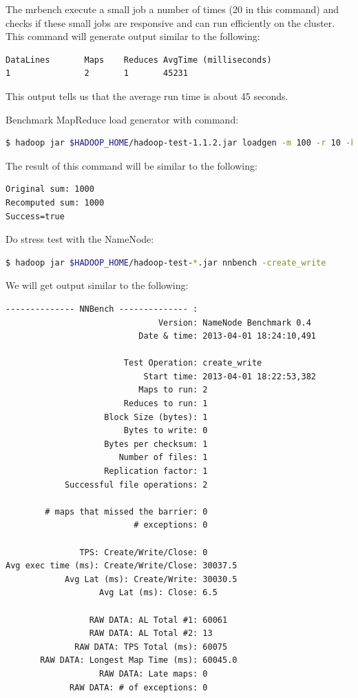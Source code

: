 The mrbench execute a small job a number of times (20 in this command) and checks if these small jobs are responsive and can run efficiently on the cluster. This command will generate output similar to the following:
\lstset{style=bashstyle}
\begin{lstlisting}
DataLines       Maps    Reduces AvgTime (milliseconds)
1               2       1       45231
\end{lstlisting}
This output tells us that the average run time is about 45 seconds.

Benchmark MapReduce load generator with command:
\lstset{style=bashstyle}
\begin{lstlisting}[language=bash]
$ hadoop jar $HADOOP_HOME/hadoop-test-1.1.2.jar loadgen -m 100 -r 10 -keepmap 50 -keepred 50 -indir input -outdir output
\end{lstlisting}

The result of this command will be similar to the following:
\begin{verbatim}
Original sum: 1000
Recomputed sum: 1000
Success=true
\end{verbatim}

Do stress test with the NameNode:
\lstset{style=bashstyle}
\begin{lstlisting}[language=bash]
$ hadoop jar $HADOOP_HOME/hadoop-test-*.jar nnbench -create_write
\end{lstlisting}

We will get output similar to the following:
\lstset{style=bashstyle}
\begin{lstlisting}
-------------- NNBench -------------- :
                               Version: NameNode Benchmark 0.4
                           Date & time: 2013-04-01 18:24:10,491

                        Test Operation: create_write
                            Start time: 2013-04-01 18:22:53,382
                           Maps to run: 2
                        Reduces to run: 1
                    Block Size (bytes): 1
                        Bytes to write: 0
                    Bytes per checksum: 1
                       Number of files: 1
                    Replication factor: 1
            Successful file operations: 2

        # maps that missed the barrier: 0
                          # exceptions: 0

               TPS: Create/Write/Close: 0
Avg exec time (ms): Create/Write/Close: 30037.5
            Avg Lat (ms): Create/Write: 30030.5
                   Avg Lat (ms): Close: 6.5

                 RAW DATA: AL Total #1: 60061
                 RAW DATA: AL Total #2: 13
              RAW DATA: TPS Total (ms): 60075
       RAW DATA: Longest Map Time (ms): 60045.0
                   RAW DATA: Late maps: 0
             RAW DATA: # of exceptions: 0
\end{lstlisting}

